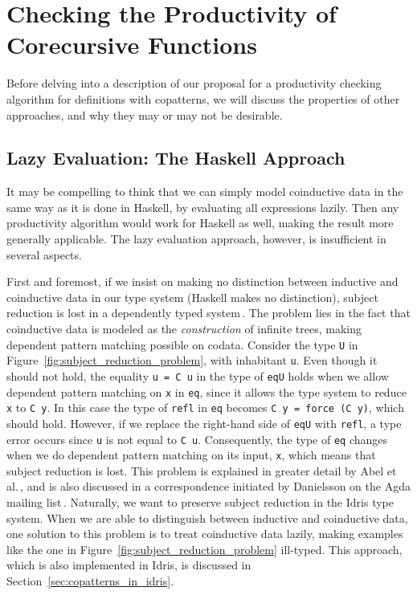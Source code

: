 \section{Checking the Productivity of Corecursive Functions}
\label{sec:productivity}

Before delving into a description of our proposal for a productivity checking algorithm for definitions with copatterns, we will discuss the properties of other approaches, and why they may or may not be desirable.

\subsection{Lazy Evaluation: The Haskell Approach}
It may be compelling to think that we can simply model coinductive data in the same way as it is done in Haskell, by evaluating all expressions lazily. Then any productivity algorithm would work for Haskell as well, making the result more generally applicable. The lazy evaluation approach, however, is insufficient in several aspects.

First and foremost, if we insist on making no distinction between inductive and coinductive data in our type system (Haskell makes no distinction), subject reduction is lost in a dependently typed system\,\citep{Abel13Copatterns}. The problem lies in the fact that coinductive data is modeled as the \emph{construction} of infinite trees, making dependent pattern matching possible on codata. Consider the type \texttt{U} in Figure~\ref{fig:subject_reduction_problem}, with inhabitant \texttt{u}. Even though it should not hold, the equality \texttt{u = C u} in the type of \texttt{eqU} holds when we allow dependent pattern matching on \texttt{x} in \texttt{eq}, since it allows the type system to reduce \texttt{x} to \texttt{C y}. In this case the type of \texttt{refl} in \texttt{eq} becomes \texttt{C y = force (C y)}, which should hold. However, if we replace the right-hand side of \texttt{eqU} with \texttt{refl}, a type error occurs since \texttt{u} is not equal to \texttt{C u}. Consequently, the type of \texttt{eq} changes when we do dependent pattern matching on its input, \texttt{x}, which means that subject reduction is lost. This problem is explained in greater detail by Abel et al.\,\citep{Abel13Copatterns}, and is also discussed in a correspondence initiated by Danielsson on the Agda mailing list\,\citep{OuryCounterexample}. Naturally, we want to preserve subject reduction in the Idris type system. When we are able to distinguish between inductive and coinductive data, one solution to this problem is to treat coinductive data lazily, making examples like the one in Figure~\ref{fig:subject_reduction_problem} ill-typed. This approach, which is also implemented in Idris, is discussed in Section~\ref{sec:copatterns_in_idris}.

